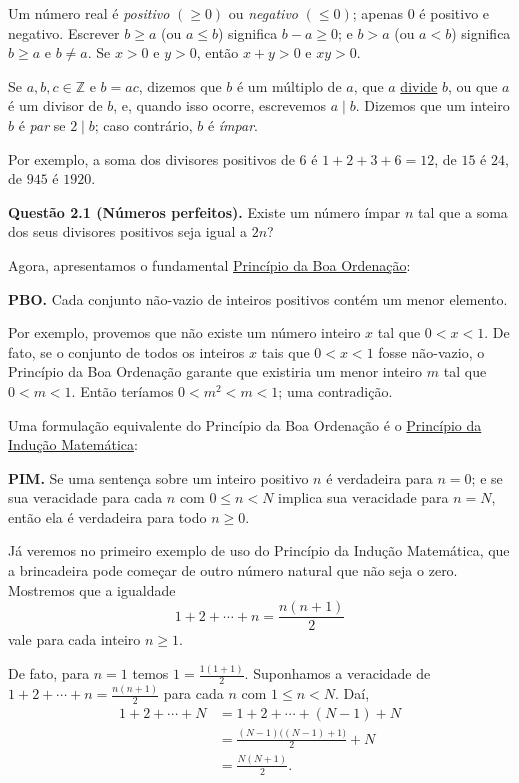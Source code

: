 Um número real é \emph{positivo} $(\geq 0)$ ou \emph{negativo} $(\leq 0)$; apenas $0$ é 
positivo e negativo. 
Escrever $b \geq a$ (ou $a \leq b$) significa $b - a \geq 0$; 
e $b > a$ (ou $a < b$) significa $b \geq a$ e $b \neq a$. 
Se $x > 0$ e $y > 0$, então $x + y > 0$ e $xy > 0$.

Se $a, b, c \in \mathbb{Z}$ e $b = ac$, dizemos que $b$ é um múltiplo de $a$, 
que $a$ \underline{divide} $b$, ou que $a$ é um divisor de $b$, e, quando isso ocorre, 
escrevemos $a \mid b$. 
Dizemos que um inteiro $b$ é \emph{par} se $2 \mid b$; caso contrário, $b$ é 
\emph{ímpar}.

Por exemplo, a soma dos divisores positivos de $6$ é 
$1 + 2 + 3 + 6 = 12$, de $15$ é $24$, de $945$ é $1920$.

\textbf{Questão 2.1 (Números perfeitos).} 
Existe um número ímpar $n$ tal que a soma dos seus divisores positivos seja igual a $2n$?

Agora, apresentamos o fundamental \underline{Princípio da Boa Ordenação}:

\textbf{PBO.} 
Cada conjunto não-vazio de inteiros positivos contém um menor elemento.

Por exemplo, provemos que não existe um número inteiro $x$ tal que $0 < x < 1$. 
De fato, se o conjunto de todos os inteiros $x$ tais que $0 < x < 1$ fosse não-vazio, 
o Princípio da Boa Ordenação garante que existiria um menor inteiro $m$ tal que 
$0 < m < 1$. Então teríamos $0 < m^{2} < m < 1$; uma contradição.

Uma formulação equivalente do Princípio da Boa Ordenação é o 
\underline{Princípio da Indução Matemática}:

\textbf{PIM.} 
Se uma sentença sobre um inteiro positivo $n$ é verdadeira para $n = 0$; 
e se sua veracidade para cada $n$ com $0 \leq n < N$ implica sua veracidade 
para $n = N$, então ela é verdadeira para todo $n \geq 0$.

Já veremos no primeiro exemplo de uso do Princípio da Indução Matemática, 
que a brincadeira pode começar de outro número natural que não seja o zero. 
Mostremos que a igualdade
\begin{equation}
    1 + 2 + \cdots + n = \frac{n(n+1)}{2}
\end{equation}
vale para cada inteiro $n \geq 1$.

De fato, para $n = 1$ temos $1 = \frac{1(1+1)}{2}$. Suponhamos a veracidade de $1 + 2 + \cdots + n = \frac{n(n+1)}{2}$
para cada $n$ com $1 \leq n < N$. Daí,
\begin{align*}
    1 + 2 + \cdots + N 
    &= 1 + 2 + \cdots + (N-1) + N \\[4pt]
    &= \frac{(N-1)\big((N-1)+1\big)}{2} + N \\[4pt]
    &= \frac{N(N+1)}{2}.
\end{align*}

